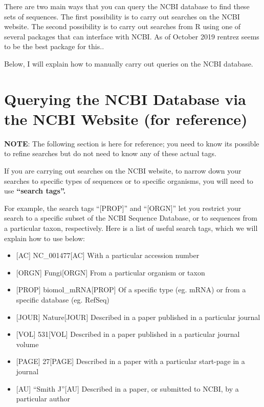 \documentclass[
]{book}
\providecommand{\tightlist}{%
  \setlength{\itemsep}{0pt}\setlength{\parskip}{0pt}}
\begin{document}
There are two main ways that you can query the NCBI database to find these sets of sequences. The first possibility is to carry out searches on the NCBI website. The second possibility is to carry out searches from R using one of several packages that can interface with NCBI. As of October 2019 rentrez seems to be the best package for this..

Below, I will explain how to manually carry out queries on the NCBI database.

\hypertarget{querying-the-ncbi-database-via-the-ncbi-website-for-reference}{%
\section{Querying the NCBI Database via the NCBI Website (for reference)}\label{querying-the-ncbi-database-via-the-ncbi-website-for-reference}}

\textbf{NOTE}: The following section is here for reference; you need to know its possible to refine searches but do not need to know any of these actual tags.

If you are carrying out searches on the NCBI website, to narrow down your searches to specific types of sequences or to specific organisms, you will need to use \textbf{``search tags''.}

For example, the search tags ``{[}PROP{]}'' and ``{[}ORGN{]}'' let you restrict your search to a specific subset of the NCBI Sequence Database, or to sequences from a particular taxon, respectively. Here is a list of useful search tags, which we will explain how to use below:

\begin{itemize}
\tightlist
\item
  {[}AC{]} NC\_001477{[}AC{]} With a particular accession number
\item
  {[}ORGN{]} Fungi{[}ORGN{]} From a particular organism or taxon
\item
  {[}PROP{]} biomol\_mRNA{[}PROP{]} Of a specific type (eg. mRNA) or from a specific database (eg. RefSeq)
\item
  {[}JOUR{]} Nature{[}JOUR{]} Described in a paper published in a particular journal
\item
  {[}VOL{]} 531{[}VOL{]} Described in a paper published in a particular journal volume
\item
  {[}PAGE{]} 27{[}PAGE{]} Described in a paper with a particular start-page in a journal
\item
  {[}AU{]} ``Smith J''{[}AU{]} Described in a paper, or submitted to NCBI, by a particular author
\end{itemize}
\end{document}
